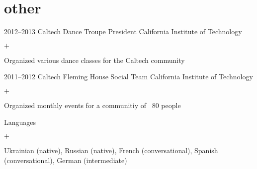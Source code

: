 \documentclass[]{luger-cv} %
\begin{document}
\ifdefined \onepage \else
{}
\fi


\ifdefined \withother

    \section{other}
    \begin{entrylist}


    \entry
    {2012--2013}
    {Caltech Dance Troupe President}
    {California Institute of Technology}
    {%
    \vspace{-1em}
    \begin{list}{$+$}{\cvlist}
    \item Organized various dance classes for the Caltech community
    \end{list}
    }


    \entry
    {2011--2012}
    {Caltech Fleming House Social Team}
    {California Institute of Technology}
    {%
    \vspace{-1em}
    \begin{list}{$+$}{\cvlist}
    \item Organized monthly events for a communitiy of ~80 people
    \end{list}
    }


    \entry
    {}
    {Languages}
    {}
    {%
    \vspace{-1em}
    \begin{list}{$+$}{\cvlist}
    \item Ukrainian (native), Russian (native), French (conversational), Spanish (conversational), German (intermediate)
    \end{list}
    }


    \end{entrylist}
\fi
\end{document}
